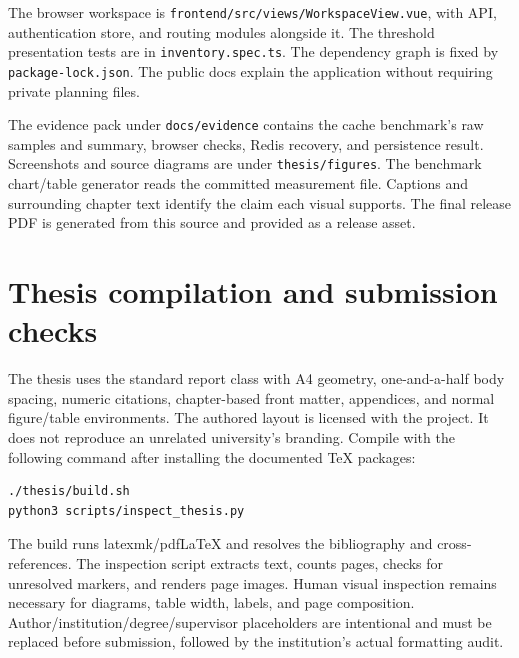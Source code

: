 The browser workspace is \texttt{frontend/src/views/WorkspaceView.vue}, with API, authentication store, and routing modules alongside it. The threshold presentation tests are in \texttt{inventory.spec.ts}. The dependency graph is fixed by \texttt{package-lock.json}. The public docs explain the application without requiring private planning files.

The evidence pack under \texttt{docs/evidence} contains the cache benchmark's raw samples and summary, browser checks, Redis recovery, and persistence result. Screenshots and source diagrams are under \texttt{thesis/figures}. The benchmark chart/table generator reads the committed measurement file. Captions and surrounding chapter text identify the claim each visual supports. The final release PDF is generated from this source and provided as a release asset.

\section{Thesis compilation and submission checks}
The thesis uses the standard report class with A4 geometry, one-and-a-half body spacing, numeric citations, chapter-based front matter, appendices, and normal figure/table environments. The authored layout is licensed with the project. It does not reproduce an unrelated university's branding. Compile with the following command after installing the documented TeX packages:
\begin{lstlisting}
./thesis/build.sh
python3 scripts/inspect_thesis.py
\end{lstlisting}

The build runs latexmk/pdfLaTeX and resolves the bibliography and cross-references. The inspection script extracts text, counts pages, checks for unresolved markers, and renders page images. Human visual inspection remains necessary for diagrams, table width, labels, and page composition. Author/institution/degree/supervisor placeholders are intentional and must be replaced before submission, followed by the institution's actual formatting audit.
